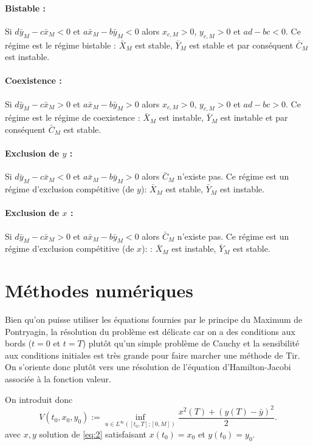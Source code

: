 \documentclass[a4paper,11pt,draft]{article}
\begin{document}
\paragraph{Bistable :}
Si $d\bar{y}_M-c\bar{x}_M <0$ et $a\bar{x}_M-b\bar{y}_M < 0$ alors $x_{c,M}>0$, $y_{c,M}>0$ et  $ad-bc<0$. Ce régime est le régime bistable :
$\bar{X}_M$ est stable, $\bar{Y}_M$ est stable et par conséquent $\bar{C}_M$ est instable.

\paragraph{Coexistence :}
Si $d\bar{y}_{M}-c\bar{x}_{M} >0$ et $a\bar{x}_{M}-b\bar{y}_{M} > 0$ alors $x_{c,M}>0$, $y_{c,M}>0$ et  $ad-bc>0$. Ce régime est le régime de coexistence :
$\bar{X}_{M}$ est instable, $\bar{Y}_{M}$ est instable et par conséquent $\bar{C}_{M}$ est stable.

\paragraph{Exclusion de $y$ :}
Si $d\bar{y}_{M}-c\bar{x}_{M} <0$ et $a\bar{x}_{M}-b\bar{y}_{M} > 0$ alors $\bar{C}_{M}$ n'existe pas. Ce régime est un régime d'exclusion compétitive (de $y$):
$\bar{X}_M$ est stable, $\bar{Y}_M$ est instable.

\paragraph{Exclusion de $x$ :}
Si $d\bar{y}_M-c\bar{x}_M >0$ et $a\bar{x}_M-b\bar{y}_M < 0$ alors $\bar{C}_{M}$ n'existe pas. Ce régime est  un régime d'exclusion compétitive (de $x$): :
$\bar{X}_M$ est instable, $\bar{Y}_M$ est stable.

\section{Méthodes numériques}

Bien qu'on puisse utiliser les équations fournies par le principe du Maximum de Pontryagin, la
résolution du problème est délicate car on a des conditions aux bords ($t=0$ et $t=T$) plutôt
qu'un simple problème de Cauchy et la sensibilité aux conditions initiales est très grande pour
faire marcher une méthode de Tir. On s'oriente donc plutôt vers une résolution de l'équation
d'Hamilton-Jacobi associée à la fonction valeur.

On introduit donc 
\begin{equation}
    V(t_0, x_0, y_0) := \underset{u\in L^\infty([t_0,T]; [0,M])}{\inf} \frac{x^2(T) +
    (y(T)-\bar{y})^2}{2}. 
\end{equation}
avec $x,y$ solution de \eqref{eq:2} satisfaisant $x(t_0)=x_0$ et $y(t_0)=y_0$.
\end{document}
